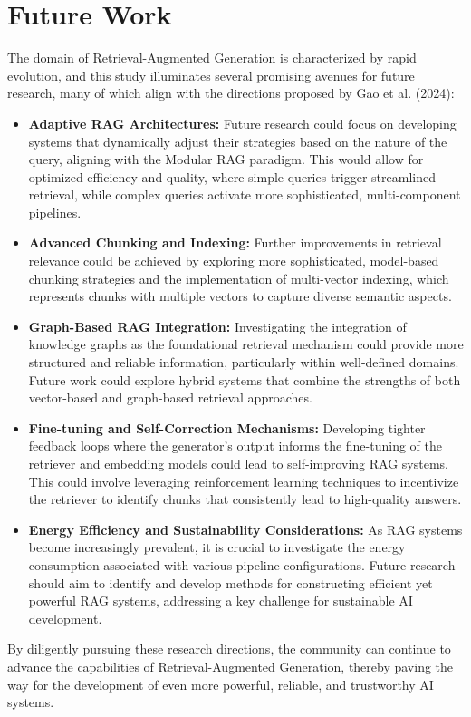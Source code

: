 \section{Future Work}

The domain of Retrieval-Augmented Generation is characterized by rapid evolution, and this study illuminates several promising avenues for future research, many of which align with the directions proposed by Gao et al. (2024):
\begin{itemize}
    \item \textbf{Adaptive RAG Architectures:} Future research could focus on developing systems that dynamically adjust their strategies based on the nature of the query, aligning with the Modular RAG paradigm. This would allow for optimized efficiency and quality, where simple queries trigger streamlined retrieval, while complex queries activate more sophisticated, multi-component pipelines.
    \item \textbf{Advanced Chunking and Indexing:} Further improvements in retrieval relevance could be achieved by exploring more sophisticated, model-based chunking strategies and the implementation of multi-vector indexing, which represents chunks with multiple vectors to capture diverse semantic aspects.
    \item \textbf{Graph-Based RAG Integration:} Investigating the integration of knowledge graphs as the foundational retrieval mechanism could provide more structured and reliable information, particularly within well-defined domains. Future work could explore hybrid systems that combine the strengths of both vector-based and graph-based retrieval approaches.
    \item \textbf{Fine-tuning and Self-Correction Mechanisms:} Developing tighter feedback loops where the generator's output informs the fine-tuning of the retriever and embedding models could lead to self-improving RAG systems. This could involve leveraging reinforcement learning techniques to incentivize the retriever to identify chunks that consistently lead to high-quality answers.
    \item \textbf{Energy Efficiency and Sustainability Considerations:} As RAG systems become increasingly prevalent, it is crucial to investigate the energy consumption associated with various pipeline configurations. Future research should aim to identify and develop methods for constructing efficient yet powerful RAG systems, addressing a key challenge for sustainable AI development.
\end{itemize}

By diligently pursuing these research directions, the community can continue to advance the capabilities of Retrieval-Augmented Generation, thereby paving the way for the development of even more powerful, reliable, and trustworthy AI systems.